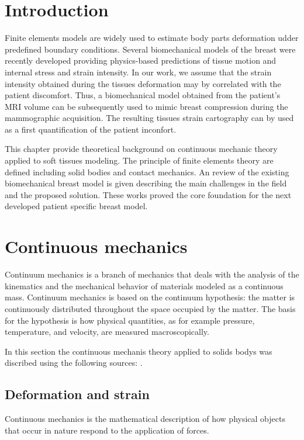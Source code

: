 \section{Introduction}\label{section:introductionbiomecamodelsbackground}


Finite elements models are widely used to estimate body parts deformation udder predefined boundary conditions. Several biomechanical models of the breast were recently developed providing physics-based predictions of tissue motion and internal stress and strain intensity.  In our work, we assume that the strain intensity obtained during the tissues deformation may by correlated with the patient discomfort. Thus, a biomechanical model obtained from the patient's MRI volume can be subsequently used to mimic breast compression during the mammographic acquisition. The resulting tissues strain cartography can by used as a first quantification of the patient inconfort.

This chapter provide theoretical background on continuous mechanic theory applied to soft tissues modeling. The principle of finite elements theory are defined including solid bodies and contact mechanics. An review of the existing biomechanical breast model is given describing the main challenges in the field and the proposed solution. These works proved the core foundation for the next developed patient specific breast model. 
      
\clearpage
\section{Continuous mechanics}
\label{section:continuousmechanics}
Continuum mechanics is a branch of mechanics that deals with the analysis of the kinematics and the mechanical behavior of materials modeled as a continuous mass. Continuum mechanics is based on the continuum hypothesis: the matter is continuously distributed throughout the space occupied by the matter. The basis for the hypothesis is how physical quantities, as for example pressure, temperature, and velocity, are measured macroscopically.

In this section the continuous mechanis theory applied to solids bodys was discribed using the following sources: \cite{belytschko_nonlinear_2013,abeyaratne_continuum_2012}.
\subsection{Deformation and strain}\label{subsection:defromationandstrain}
Continuous mechanics is the mathematical description of how  physical objects that occur in nature respond to the application of forces.

